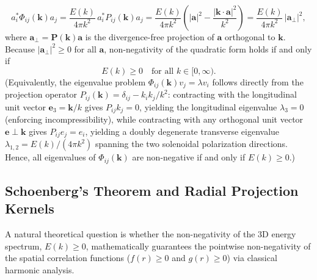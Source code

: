 \documentclass[lineno]{jfm}
\begin{document}
\begin{enumerate}
\begin{equation}
a_i^* \Phi_{ij}(\mathbf{k}) a_j = \frac{E(k)}{4\pi k^2}\, a_i^* P_{ij}(\mathbf{k}) a_j = \frac{E(k)}{4\pi k^2} \left( |\mathbf{a}|^2 - \frac{|\mathbf{k} \cdot \mathbf{a}|^2}{k^2} \right) = \frac{E(k)}{4\pi k^2}\, |\mathbf{a}_\perp|^2,
\label{eq:realizability_derivation}
\end{equation}
where $\mathbf{a}_\perp = \mathbf{P}(\mathbf{k})\mathbf{a}$ is the divergence-free projection of $\mathbf{a}$ orthogonal to $\mathbf{k}$. Because $|\mathbf{a}_\perp|^2 \ge 0$ for all $\mathbf{a}$, non-negativity of the quadratic form holds if and only if
\begin{equation}
E(k) \ge 0 \quad \text{for all } k \in [0, \infty).
\label{eq:realizability_Ek}
\end{equation}
(Equivalently, the eigenvalue problem $\Phi_{ij}(\mathbf{k}) v_j = \lambda v_i$ follows directly from the projection operator $P_{ij}(\mathbf{k}) = \delta_{ij} - k_i k_j/k^2$: contracting with the longitudinal unit vector $\mathbf{e}_3 = \mathbf{k}/k$ gives $P_{ij} k_j = 0$, yielding the longitudinal eigenvalue $\lambda_3 = 0$ (enforcing incompressibility), while contracting with any orthogonal unit vector $\mathbf{e} \perp \mathbf{k}$ gives $P_{ij} e_j = e_i$, yielding a doubly degenerate transverse eigenvalue $\lambda_{1,2} = E(k)/(4\pi k^2)$ spanning the two solenoidal polarization directions. Hence, all eigenvalues of $\Phi_{ij}(\mathbf{k})$ are non-negative if and only if $E(k) \ge 0$.)
\end{enumerate}

\subsection{Schoenberg's Theorem and Radial Projection Kernels}

A natural theoretical question is whether the non-negativity of the 3D energy spectrum, $E(k) \ge 0$, mathematically guarantees the pointwise non-negativity of the spatial correlation functions ($f(r) \ge 0$ and $g(r) \ge 0$) via classical harmonic analysis.
\end{document}
